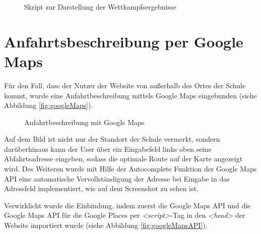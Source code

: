 \begin{figure}[!h]
	\caption{Skript zur Darstellung der Wettkampfsergebnisse}
	\label{fig:javaScript}
\end{figure}

\section{Anfahrtsbeschreibung per Google Maps}
\label{Anfahrtsbeschreibung per Google Maps}
Für den Fall, dass der Nutzer der Website von außerhalb des Ortes der Schule kommt, wurde eine Anfahrtbeschreibung mittels Google Maps eingebunden (siehe Abbildung \vref{fig:googleMaps}).

\begin{figure}[!h]
	\caption{Anfahrtbeschreibung mit Google Maps}
	\label{fig:googleMaps}
\end{figure}

Auf dem Bild ist nicht nur der Standort der Schule vermerkt, sondern darüberhinaus kann der User über ein Eingabefeld links oben seine Abfahrtsadresse eingeben, sodass die optimale Route auf der Karte angezeigt wird. Des Weiteren wurde mit Hilfe der Autocomplete Funktion der Google Maps API eine automatische Vervollständigung der Adresse bei Eingabe in das Adressfeld implementiert, wie auf dem Screenshot zu sehen ist.
\par
Verwirklicht wurde die Einbindung, indem zuerst die Google Maps API und die Google Maps API für die Google Places per \textit{<script>}-Tag in den \textit{<head>} der Website importiert wurde (siehe Abbildung \vref{fig:googleMapsAPI}).

